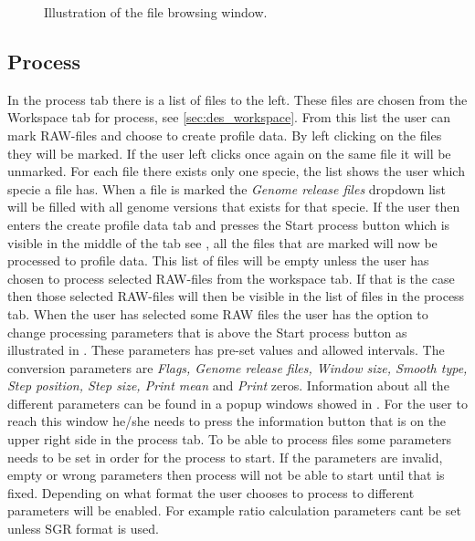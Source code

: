 \begin{figure}[h]
	\caption{Illustration of the file browsing window.}
	\label{fig:des_upload}
\end{figure}
\FloatBarrier

\subsection{Process}
In the process tab there is a list of files to the left. These files are chosen from the Workspace tab for process, see \ref{sec:des_workspace}. From this list the user can mark RAW-files and choose to create profile data. By left clicking on the files they will be marked. If the user left clicks once again on the same file it will be unmarked. For each file there exists only one specie, the list shows the user which specie a file has. When a file is marked the \emph{Genome release files} dropdown list will be filled with all genome versions that exists for that specie. If the user then enters the create profile data tab and presses the Start process button which is visible in the middle of the tab see , all the files that are marked will now be processed to profile data. This list of files will be empty unless the user has chosen to process selected RAW-files from the workspace tab. If that is the case then those selected RAW-files will then be visible in the list of files in the process tab. When the user has selected some RAW files the user has the option to change processing parameters that is above the Start process button as illustrated in . These parameters has pre-set values and allowed intervals. The conversion parameters are \emph{Flags, Genome release files, Window size, Smooth type, Step position, Step size, Print mean} and \emph{Print} zeros. Information about all the different parameters can be found in a popup windows showed in . For the user to reach this window he/she needs to press the information button that is on the upper right side in the process tab. To be able to process files some parameters needs to be set in order for the process to start. If the parameters are invalid, empty or wrong parameters then process will not be able to start until that is fixed. Depending on what format the user chooses to process to different parameters will be enabled. For example ratio calculation parameters cant be set unless SGR format is used.

